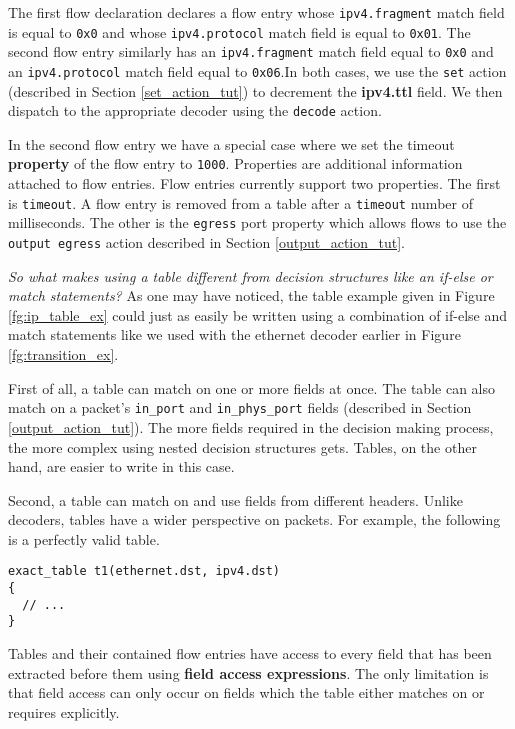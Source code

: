 The first flow declaration declares a flow entry whose \texttt{ipv4.fragment} match field is equal to \texttt{0x0} and whose \texttt{ipv4.protocol} match field is equal to \texttt{0x01}. The second flow entry similarly has an \texttt{ipv4.fragment} match field equal to \texttt{0x0} and an \texttt{ipv4.protocol} match field equal to \texttt{0x06}.In both cases, we use the \texttt{set} action (described in Section \ref{set_action_tut}) to decrement the \textbf{ipv4.ttl} field. We then dispatch to the appropriate decoder using the \texttt{decode} action.

In the second flow entry we have a special case where we set the timeout \textbf{property} of the flow entry to \texttt{1000}. Properties are additional information attached to flow entries. Flow entries currently support two properties. The first is \texttt{timeout}. A flow entry is removed from a table after a \texttt{timeout} number of milliseconds. The other is the \texttt{egress} port property which allows flows to use the \texttt{\color{blue}output \color{green}egress} action described in Section \ref{output_action_tut}.

\textit{So what makes using a table different from decision structures like an if-else or match statements?} As one may have noticed, the table example given in Figure \ref{fg:ip_table_ex} could just as easily be written using a combination of if-else and match statements like we used with the ethernet decoder earlier in Figure \ref{fg:transition_ex}. 

First of all, a table can match on one or more fields at once. The table can also match on a packet's \texttt{in\_port} and \texttt{in\_phys\_port} fields (described in Section \ref{output_action_tut}). The more fields required in the decision making process, the more complex using nested decision structures gets. Tables, on the other hand, are easier to write in this case.

Second, a table can match on and use fields from different headers. Unlike decoders, tables have a wider perspective on packets. For example, the following is a perfectly valid table. 

\begin{lstlisting}
exact_table t1(ethernet.dst, ipv4.dst)
{
  // ...
}
\end{lstlisting}

Tables and their contained flow entries have access to every field that has been extracted before them using \textbf{field access expressions}. The only limitation is that field access can only occur on fields which the table either matches on or requires explicitly.

